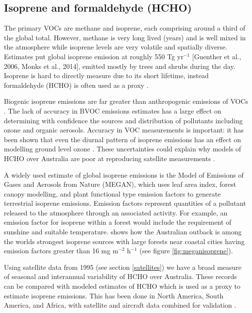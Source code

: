 \subsection{Isoprene and formaldehyde (HCHO)}
\label{proxy}
The primary VOCs are methane and isoprene, each comprising around a third of the global total.
However, methane is very long lived (years) and is well mixed in the atmosphere while isoprene levels are very volatile and spatially diverse. Estimates put global isoprene emission at roughly 550 Tg yr$^{−1}$ [Guenther et al., 2006, Monks et al., 2014], emitted mostly by trees and shrubs during the day.
Isoprene is hard to directly measure due to its short lifetime, instead formaldehyde (HCHO) is often used as a proxy \cite{Marais_2012,bauwens2013satellite}.

Biogenic isoprene emissions are far greater than anthropogenic emissions of VOCs \cite{Guenther_2006}. 
The lack of accuracy in BVOC emissions estimates has a large effect on determining with confidence the sources and distribution of pollutants including ozone and organic aerosols.
Accuracy in VOC measurements is important: it has been shown that even the diurnal pattern of isoprene emissions has an effect on modelling ground level ozone \cite{Hewitt_2011,Fan_2004}.
These uncertainties could explain why models of HCHO over Australia are poor at reproducing satellite measurements \cite{Stavrakou_2008}.

A widely used estimate of global isoprene emissions is the Model of Emissions of Gases and Aerosols from Nature (MEGAN), which uses leaf area index, forest canopy modelling, and plant functional type emission factors to generate terrestrial isoprene emissions.
Emission factors represent quantities of a pollutant released to the atmosphere through an associated activity.
For example, an emission factor for isoprene within a forest would include the requirement of sunshine and suitable temperature.
\citet{Guenther_2006} shows how the Australian outback is among the worlds strongest isoprene sources with large forests near coastal cities having emission factors greater than 16 mg m$^{-2}$ h$^{-1}$ (see figure \ref{fig:meganisoprene}).

Using satellite data from 1995 (see section \ref{satellites}) we have a broad measure of seasonal and interannual variability of HCHO over Australia.
These records can be compared with modeled estimates of HCHO which is used as a proxy to estimate isoprene emissions.
This has been done in North America, South America, and Africa, with satellite and aircraft data combined for validation \cite{Millet_2006, Marais_2014}.

